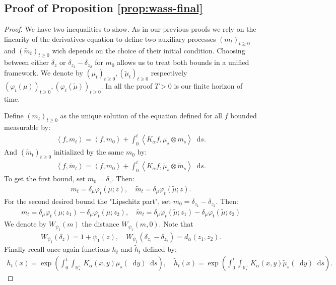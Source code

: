 \documentclass[11pt,a4paper]{article}
\newcommand{\RRP}{\mathbb{R}^+_*}
\newcommand{\Proc}[1]{\left(#1\right)_{t\geq 0}}
\newcommand{\brac}[1]{\left\langle#1\right\rangle}
\newcommand{\dd}{\mathop{}\!\mathrm{d}}
\begin{document}
\subsection{Proof of Proposition \ref{prop:wass-final}} 
\begin{proof}
    We have two inequalities to show. As in our previous proofs we rely on the linearity of the derivatives equation to define two auxiliary processes $\Proc{m_t}$ and $\Proc{\tilde{m}_t}$ wich depends on the choice of their initial condition. Choosing between either $\delta_z$ or $\delta_{z_1}-\delta_{z_2}$ for $m_0$ allows us to treat both bounds in a unified framework. We denote by $\Proc{\mu_t},\Proc{\tilde{\mu}_t}$ respectively $\Proc{\varphi_t(\mu)},\Proc{\varphi_t(\tilde{\mu})}$. In all the proof $T> 0$ is our finite horizon of time.
    
    
    Define $\Proc{m_t}$ as the unique solution of the equation defined for all $f$ bounded measurable by:
    \begin{align*}
        \brac{f,m_t} = \brac{f,m_0} + \int_0^t \brac{K_\alpha f,\mu_s\otimes m_s} \dd s.
    \end{align*}
    And $\Proc{\tilde{m}_t}$ initialized by the same $m_0$ by:
    \begin{align*}
        \brac{f,\tilde{m}_t} = \brac{f,m_0} + \int_0^t \brac{K_\alpha f,\tilde{\mu}_s\otimes \tilde{m}_s} \dd s.
    \end{align*}
    To get the first bound, set $m_0 = \delta_z$. Then:
    \begin{align*}
        m_t = \delta_\mu \varphi_t(\mu;z) , \quad \tilde{m}_t = \delta_\mu \varphi_t(\tilde{\mu};z).
    \end{align*}
    For the second desired bound the "Lipschitz part", set $m_0 = \delta_{z_1} - \delta_{z_2}$. Then:
    \begin{align*}
        m_t = \delta_\mu \varphi_t(\mu;z_1) - \delta_\mu \varphi_t(\mu;z_2), \quad \tilde{m}_t = \delta_\mu \varphi_t(\tilde{\mu};z_1) - \delta_\mu \varphi_t(\tilde{\mu};z_2)
    \end{align*}
    We denote by $W_{\psi_1}(m)$ the distance $W_{\psi_1}(m,0)$. Note that 
    \begin{align*}
        W_{\psi_1}(\delta_z) = 1 + \psi_1(z) ,\quad W_{\psi_1}\left( \delta_{z_1} - \delta_{z_2}\right) = d_{\alpha}(z_1,z_2).
    \end{align*}
    Finally recall once again functions $h_t$ and $\tilde{h}_t$ defined by:
    \begin{align*}
        h_t(x) = \exp\left(\int_0^t \int_{\RRP} K_\alpha(x,y) \mu_s(\dd y)\dd s \right), \quad \tilde{h}_t(x) = \exp\left(\int_0^t \int_{\RRP} K_\alpha(x,y) \tilde{\mu}_s(\dd y)\dd s \right).

\end{align*}
\end{proof}
\end{document}
